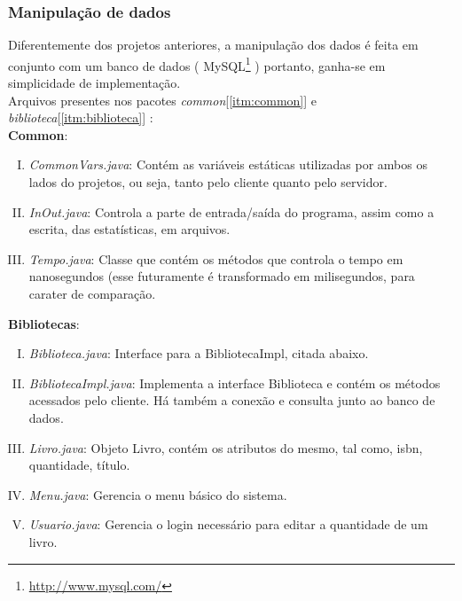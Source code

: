 \documentclass[a4paper,10pt]{article}
\begin{document}
\subsubsection{Manipulação de dados}
Diferentemente dos projetos anteriores, a manipulação dos dados é feita em conjunto com um banco de dados ( MySQL\footnote{\url{http://www.mysql.com/}} ) portanto,
ganha-se em simplicidade de implementação.
\\Arquivos presentes nos pacotes \emph{common}[\ref{itm:common}] e \emph{biblioteca}[\ref{itm:biblioteca}] :
\\\textbf{Common}:
\begin{enumerate}[I.]
\item \label{itm:commonvarsj}\emph{CommonVars.java}: Contém as variáveis estáticas utilizadas por ambos os lados do projetos, ou seja, tanto pelo cliente quanto pelo servidor.
\item \label{itm:inoutj} \emph{InOut.java}: Controla a parte de entrada/saída do programa, assim como a escrita, das estatísticas, em arquivos.
\item \label{itm:tempoj} \emph{Tempo.java}: Classe que contém os métodos que controla o tempo em nanosegundos (esse futuramente é transformado em milisegundos,
  para carater de comparação.
\end{enumerate}
\textbf{Bibliotecas}:
\begin{enumerate}[I.]
\item \label{itm:bibliotecaj} \emph{Biblioteca.java}: Interface para a BibliotecaImpl, citada abaixo.
\item \label{itm:bibliotecaimplj} \emph{BibliotecaImpl.java}: Implementa a interface Biblioteca e contém os métodos acessados pelo cliente. Há também a conexão e consulta junto
  ao banco de dados.
\item \label{itm:livroj} \emph{Livro.java}: Objeto Livro, contém os atributos do mesmo, tal como, isbn, quantidade, título.
\item \label{itm:menuj} \emph{Menu.java}: Gerencia o menu básico do sistema.
\item \label{itm:usuarioj} \emph{Usuario.java}: Gerencia o login necessário para editar a quantidade de um livro.
\end{enumerate}
\end{document}
